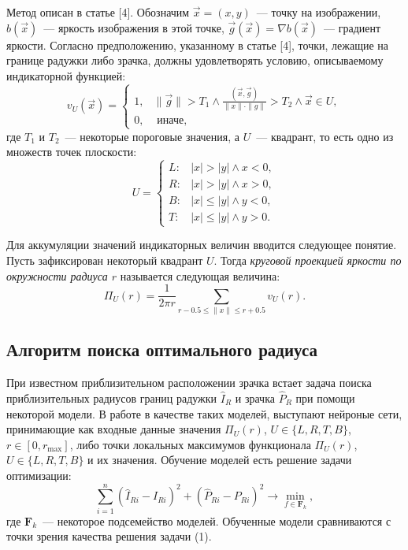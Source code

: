 \documentclass[12pt, twoside]{article}
\begin{document}
Метод описан в статье [4]. Обозначим $\vec{x} = (x, y)$~--- точку на изображении, $b(\vec{x})$~--- яркость изображения в этой точке, $\vec{g}(\vec{x}) = \nabla b(\vec{x})$~--- градиент яркости. Согласно предположению, указанному в статье [4], точки, лежащие на границе радужки либо зрачка, должны удовлетворять условию, описываемому индикаторной функцией:
\[
v_U(\vec{x}) = \begin{cases}1, & \parallel \vec{g} \parallel > T_1 \land \frac{(\vec{x}, \vec{g})}{\parallel x \parallel \cdot \parallel g \parallel} > T_2 \land \vec{x} \in U, \\ 0, & \text{ иначе,}\end{cases}
\]
где $T_1$ и $T_2$~--- некоторые пороговые значения, а $U$~--- квадрант, то есть одно из множеств точек плоскости:
\[
U = \begin{cases}L\!: & |x| > |y| \land x < 0, \\ R\!: & |x| > |y| \land x > 0, \\ B\!: & |x| \leqslant |y| \land y < 0, \\ T\!: & |x| \leqslant |y| \land y > 0.\end{cases}
\]

Для аккумуляции значений индикаторных величин вводится следующее понятие. Пусть зафиксирован некоторый квадрант $U$. Тогда \textit{круговой проекцией яркости по окружности радиуса $r$} называется следующая величина:
\[
\Pi_U(r) = \frac{1}{2\pi r} \sum_{r-0.5 \leqslant \parallel x \parallel \leqslant r + 0.5} v_U(r).
\]

\subsection{Алгоритм поиска оптимального радиуса}

При известном приблизительном расположении зрачка встает задача поиска приблизительных радиусов границ радужки $\widehat{I}_R$ и зрачка $\widehat{P}_R$ при помощи некоторой модели. В работе в качестве таких моделей, выступают нейроные сети, принимающие как входные данные значения $\Pi_U(r)$, $U \in \{L, R, T, B\}$,  $r \in [0, r_{\max }] $, либо точки локальных максимумов функционала $\Pi_U(r)$, $U \in \{L, R, T, B\}$ и их значения. Обучение моделей есть решение задачи оптимизации:
\begin{equation}
\sum_{i=1}^n \left(\widehat{I}_{Ri} - I_{Ri}\right)^2 + \left(\widehat{P}_{Ri} - P_{Ri}\right)^2 \to \min_{f \in \mathbf{F}_k},
\end{equation}
где $\mathbf{F}_k$~--- некоторое подсемейство моделей. Обученные модели сравниваются с точки зрения качества решения задачи (1).
\end{document}
